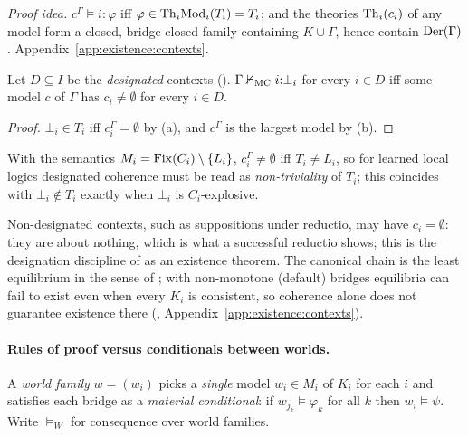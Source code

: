 \emph{Proof idea.} $c^\Gamma\models i{:}\varphi$ iff $\varphi\in\mathrm{Th}_i\mathrm{Mod}_i(T_i)=T_i$; and the theories $\mathrm{Th}_i(c_i)$ of any model form a closed, bridge-closed family containing $K\cup\Gamma$, hence contain $\mathrm{Der}(\Gamma)$. Appendix~\ref{app:existence:contexts}.

\begin{corollary}\label{cor:existence:contexts}
Let $D\subseteq I$ be the \emph{designated} contexts (). $\Gamma\nvdash_{\mathrm{MC}}i{:}\bot_i$ for every $i\in D$ iff some model $c$ of $\Gamma$ has $c_i\neq\emptyset$ for every $i\in D$.
\end{corollary}

\begin{proof}
$\bot_i\in T_i$ iff $c^\Gamma_i=\emptyset$ by (a), and $c^\Gamma$ is the largest model by (b).
\end{proof}

\begin{remark}\label{rem:existence:learnedlocal}
With the semantics $M_i=\mathrm{Fix}(C_i)\setminus\{L_i\}$, $c^\Gamma_i\neq\emptyset$ iff $T_i\neq L_i$, so for learned local logics designated coherence must be read as \emph{non-triviality} of $T_i$; this coincides with $\bot_i\notin T_i$ exactly when $\bot_i$ is $C_i$-explosive.
\end{remark}

Non-designated contexts, such as suppositions under reductio, may have $c_i=\emptyset$: they are about nothing, which is what a successful reductio shows; this is the designation discipline of  as an existence theorem. The canonical chain is the least equilibrium in the sense of \citet{brewka2007equilibria}; with non-monotone (default) bridges equilibria can fail to exist even when every $K_i$ is consistent, so coherence alone does not guarantee existence there (, Appendix~\ref{app:existence:contexts}).

\paragraph{Rules of proof versus conditionals between worlds.} A \emph{world family} $w=(w_i)$ picks a \emph{single} model $w_i\in M_i$ of $K_i$ for each $i$ and satisfies each bridge as a \emph{material conditional}: if $w_{j_k}\models\varphi_k$ for all $k$ then $w_i\models\psi$. Write $\models_W$ for consequence over world families.

